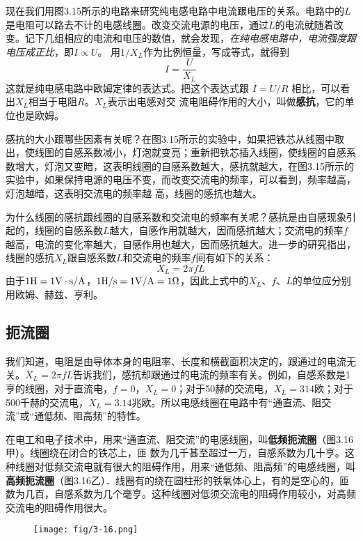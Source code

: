 现在我们用图3.15所示的电路来研究纯电感电路中电流跟电压的关系。电路中的$L$是电阻可以路去不计的电感线圈。改变交流电源的电压，通过$L$的电流就随着改变。记下几组相应的电流和电压的数值，就会发现，\textit{在纯电感电路中，电流强度跟电压成正比}，即$I\propto U$。 用$1/X_L$作为比例恒量，写成等式，就得到
\[I=\frac{U}{X_L} \]
这就是纯电感电路中欧姆定律的表达式。把这个表达式跟
$I=U/R$
相比，可以看出$X_L$相当于电阻$R$。$X_L$表示出电感对交
流电阻碍作用的大小，叫做\textbf{感抗}，它的单位也是欧姆。

感抗的大小跟哪些因素有关呢？在图3.15所示的实验中，如果把铁芯从线圈中取出，使线图的自感系数减小，灯泡就变亮；重新把铁芯插入线圈，使线圈的自感系数增大，灯泡又变暗，这表明线圈的自感系数越大，感抗就越大，在图3.15所示的实验中，如果保持电源的电压不变，而改变交流电的频率，可以看到，频率越高，灯泡越暗，这表明交流电的频率越	
高，线圈的感抗也越大。

为什么线圈的感抗跟线圈的自感系数和交流电的频率有关呢？感抗是由自感现象引起的，线圈的自感系数$L$越大，自感作用就越大，因而感抗越大；交流电的频率$f$越高，电流的变化率越大，自感作用也越大，因而感抗越大。进一步的研究指出，线圈的感抗$X_L$跟自感系数$L$和交流电的频率$f$间有如下的关系：
\[X_L=2\pi fL\]
由于$1{\rm H}=1{\rm V\cdot s/A}$，$1{\rm H/s}=1{\rm V/A}=1\Omega$，因此上式中的$X_L$、$f$、$L$的单位应分别用欧姆、赫兹、亨利。

\subsection{扼流圈}

我们知道，电阻是由导体本身的电阻率、长度和横截面积决定的，跟通过的电流无关。$X_L=2\pi fL$告诉我们，感抗却跟通过的电流的频率有关。例如，自感系数是1亨的线圈，对于直流电，$f=0$，$X_L=0$；对于50赫的交流电，$X_L=314$欧；对于500千赫的交流电，$X_L=3.14$兆欧。所以电感线圈在电路中有“通直流、阻交流”或“通低频、阻高频”的特性。

在电工和电子技术中，用来“通直流、阻交流”的电感线圈，叫\textbf{低频扼流圈}（图3.16甲）。线圈绕在闭合的铁芯上，匝
数为几千甚至超过一万，自感系数为几十亨。这种线圈对低频交流电就有很大的阻碍作用，用来“通低频、阻高频”的电感线圈，叫\textbf{高频扼流圈}（图3.16乙）．线圈有的绕在圆柱形的铁氧体心上，有的是空心的，匝数为几百，自感系数为几个毫亨。这种线圈对低须交流电的阻碍作用较小，对高频交流电的阻碍作用很大。
\begin{figure}[htp]\centering
\texttt{[image: fig/3-16.png]}
\caption{}
\end{figure}

